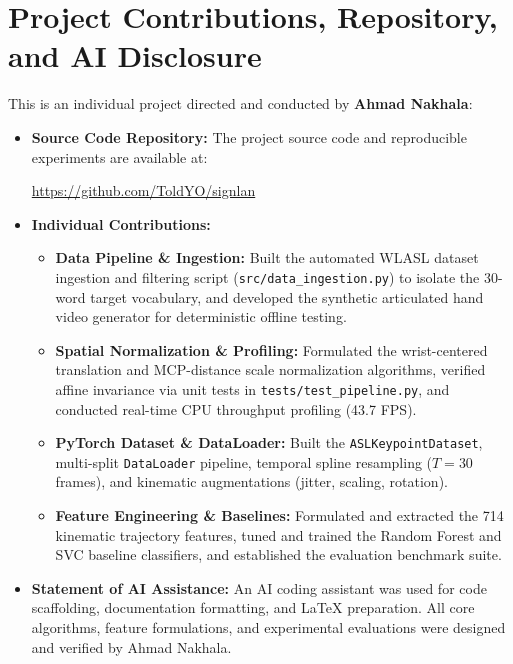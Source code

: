 \documentclass{article}
\begin{document}
\section*{Project Contributions, Repository, and AI Disclosure}
This is an individual project directed and conducted by \textbf{Ahmad Nakhala}:
\begin{itemize}
    \item \textbf{Source Code Repository:} The project source code and reproducible experiments are available at:
    \begin{center}
        \url{https://github.com/ToldYO/signlan}
    \end{center}
    \item \textbf{Individual Contributions:}
    \begin{itemize}
        \item \textbf{Data Pipeline \& Ingestion:} Built the automated WLASL dataset ingestion and filtering script (\texttt{src/data\_ingestion.py}) to isolate the 30-word target vocabulary, and developed the synthetic articulated hand video generator for deterministic offline testing.
        \item \textbf{Spatial Normalization \& Profiling:} Formulated the wrist-centered translation and MCP-distance scale normalization algorithms, verified affine invariance via unit tests in \texttt{tests/test\_pipeline.py}, and conducted real-time CPU throughput profiling (43.7 FPS).
        \item \textbf{PyTorch Dataset \& DataLoader:} Built the \texttt{ASLKeypointDataset}, multi-split \texttt{DataLoader} pipeline, temporal spline resampling ($T=30$ frames), and kinematic augmentations (jitter, scaling, rotation).
        \item \textbf{Feature Engineering \& Baselines:} Formulated and extracted the 714 kinematic trajectory features, tuned and trained the Random Forest and SVC baseline classifiers, and established the evaluation benchmark suite.
    \end{itemize}
    \item \textbf{Statement of AI Assistance:} An AI coding assistant was used for code scaffolding, documentation formatting, and LaTeX preparation. All core algorithms, feature formulations, and experimental evaluations were designed and verified by Ahmad Nakhala.
\end{itemize}
\end{document}
